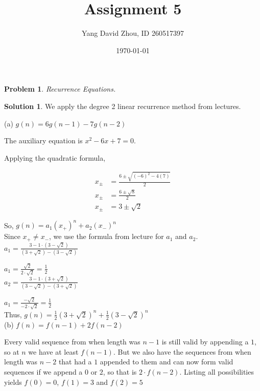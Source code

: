 \documentclass{article}
\newtheorem{problem}{Problem}
\theoremstyle{definition}
\newtheorem*{solution}{Solution}
\begin{document}
 \title{Assignment 5} 

\author{Yang David Zhou, ID 260517397} 

\date{\today}

\maketitle

\begin{problem} 

Recurrence Equations.

\end{problem}

\begin{solution} 

We apply the degree 2 linear recurrence method from lectures.

(a) \(g(n)=6g(n-1)-7g(n-2)\)

The auxiliary equation is \(x^2-6x+7=0\).

Applying the quadratic formula,

\begin{align*}
x_{\pm} &= \frac{6\pm \sqrt{(-6)^2 -4(7)}}{2} \\
x_{\pm} &= \frac{6\pm \sqrt{8}}{2} \\
x_{\pm} &= 3\pm \sqrt{2}
\end{align*}

So, \(g(n)=a_1(x_+)^n +a_2(x_-)^n\) \\

Since \(x_+ \neq x_-\), we use the formula from lecture for \(a_1\) and \(a_2\). \\

\(a_1=\frac{3-1\cdot (3-\sqrt{2})}{(3+\sqrt{2})-(3-\sqrt{2})}\)

\(a_1=\frac{\sqrt{2}}{2\cdot \sqrt{2}}=\frac{1}{2}\) \\

\(a_2=\frac{3-1\cdot (3+\sqrt{2})}{(3-\sqrt{2})-(3+\sqrt{2})}\)

\(a_1=\frac{-\sqrt{2}}{-2\cdot \sqrt{2}}=\frac{1}{2}\) \\

Thus, \(g(n)=\frac{1}{2}(3+ \sqrt{2})^n +\frac{1}{2}(3- \sqrt{2})^n\) \\

(b) \(f(n)=f(n-1)+2f(n-2)\)

Every valid sequence from when length was \(n-1\) is still valid by appending a \(1\), so at \(n\) we have at least \(f(n-1)\). But we also have the sequences from when length was \(n-2\) that had a \(1\) appended to them and can now form valid sequences if we append a \(0\) or \(2\), so that is \(2\cdot f(n-2)\). Listing all possibilities yields \(f(0)=0\), \(f(1)=3\) and \(f(2)=5\) \\


\end{solution}
\end{document}
